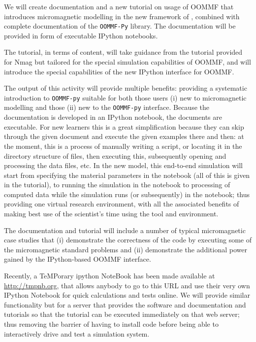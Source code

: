 \begin{workpackage}
\begin{tasklist}
\begin{task}[title=OOMMF case study: \OOMMFNB{} tutorial and
  documentation, id=oommf-tutorial-and-documentation]

  We will create documentation and a new tutorial on usage of OOMMF
  that introduces micromagnetic modelling in the new framework of
  \OOMMFNB{}, combined with complete documentation of the
  \texttt{OOMMF-Py} library. The documentation will be provided in
  form of executable IPython notebooks.

  The tutorial, in terms of content, will take guidance from the
  tutorial provided for Nmag \cite{Nmag-tutorial-url} but tailored for the
  special simulation capabilities of OOMMF, and will introduce the
  special capabilities of the new IPython interface for OOMMF.

  The output of this activity will provide multiple benefits:
  providing a systematic introduction to \texttt{OOMMF-py} suitable for both
  those users (i) new to micromagnetic modelling and those (ii) new to
  the \texttt{OOMMF-py} interface. Because the documentation is developed in an
  IPython notebook, the documents are executable. For new learners
  this is a great simplification because they can skip through the
  given document and execute the given examples there and then: at the
  moment, this is a process of manually writing a script, or locating
  it in the directory structure of files, then executing this,
  subsequently opening and processing the data files, etc. In the new
  model, this end-to-end simulation will start from specifying the
  material parameters in the notebook (all of this is given in the
  tutorial), to running the simulation in the notebook to processing
  of computed data while the simulation runs (or subsequently) in the
  notebook; thus providing one virtual research environment, with all
  the associated benefits of making best use of the scientist's time
  using the tool and environment.

  The documentation and tutorial will include a number of typical
  micromagnetic case studies that (i) demonstrate the correctness of
  the code by executing some of the micromagnetic standard problems
  and (ii) demonstrate the additional power gained by the
  IPython-based OOMMF interface.
\end{task}

\begin{task}[id=oommf-nb-ve,title=OOMMF case study: \OOMMFNB{} virtual environments]
  Recently, a TeMPorary ipython NoteBook has been made available at
  \href{http://tmpnb.org}{http://tmpnb.org}, that allows anybody to go
  to this URL and use their very own IPython Notebook for quick
  calculations and tests online. We will provide similar functionality
  but for a server that provides the \OOMMFNB{} software and \OOMMFNB{}
  documentation and tutorials so that the tutorial can be executed
  immediately on that web server; thus removing the barrier of having
  to install code before being able to interactively drive and test a
  simulation system.


\end{task}
\end{tasklist}
\end{workpackage}
